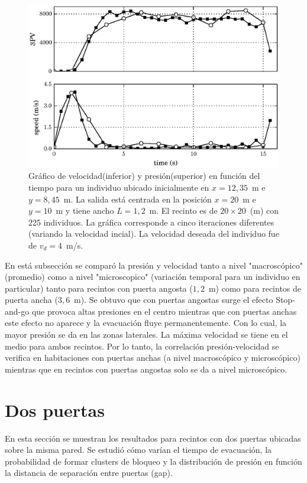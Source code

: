 \begin{figure}[H]
    \centering
    \includegraphics[scale=0.8]{figuras/pv_vel_t_100_1_2.eps}
    \caption[width=5cm]{Gráfico de velocidad(inferior) y presión(superior) en función del tiempo para un individuo ubicado inicialmente en $x=12,35$~m e $y=8,45$~m.  La salida está centrada en la posición $x=20$~m e $y=10$~m y tiene ancho $L=1,2$~m. El recinto es de $20\times 20$~(m) con 225 individuos. La gráfica corresponde a cinco iteraciones diferentes (variando la velocidad incial). La velocidad deseada del individuo fue de $v_d=4$~m/s.}
    \label{pv_vel_t_100_1_2}
\end{figure}

En está subsección se comparó la presión y velocidad tanto a nivel "macroscópico" (promedio) como a nivel "microscopico" (variación temporal para un individuo en particular) tanto para recintos con puerta angosta ($1,2$~m) como para recintos de puerta ancha ($3,6$~m). Se obtuvo que con puertas angostas surge el efecto Stop-and-go que provoca altas presiones en el centro mientras que con puertas anchas este efecto no aparece y la evacuación fluye permanentemente. Con lo cual, la mayor presión se da en las zonas laterales. La máxima velocidad se tiene en el medio para ambos recintos. Por lo tanto, la correlación presión-velocidad se verifica en habitaciones con puertas anchas (a nivel macroscópico y microscópico) mientras que en recintos con puertas angostas solo se da a nivel microscópico.  


\section{Dos puertas}

En esta sección se muestran los resultados para recintos con dos puertas ubicadas sobre la misma pared. Se estudió cómo varían el tiempo de evacuación, la probabilidad de formar clusters de bloqueo y la distribución de presión en función la distancia de separación entre puertas (gap).  

